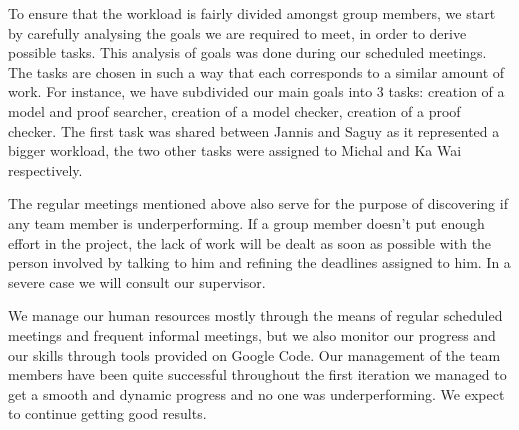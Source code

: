 To ensure that the workload is fairly divided amongst group members, we start by carefully analysing the goals we are required to meet, in order to derive possible tasks. This analysis of goals was done during our scheduled meetings. The tasks are chosen in such a way that each corresponds to a similar amount of work. For instance, we have subdivided our main goals into 3 tasks: creation of a model and proof searcher, creation of a model checker, creation of a proof checker. The first task was shared between Jannis and Saguy as it represented a bigger workload, the two other tasks were assigned to Michal and Ka Wai respectively. 

The regular meetings mentioned above also serve for the purpose of discovering if any team member is underperforming. If a group member doesn't put enough effort in the project, the lack of work will be dealt as soon as possible with the person involved by talking to him and refining the deadlines assigned to him. In a severe case we will consult our supervisor.

We manage our human resources mostly through the means of regular scheduled meetings and frequent informal meetings, but we also monitor our progress and our skills through tools provided on Google Code. Our management of the team members have been quite successful throughout the first iteration we managed to get a smooth and dynamic progress and no one was underperforming. We expect to continue getting good results. 
